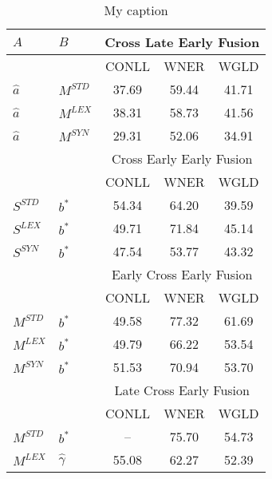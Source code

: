 


\begin{table}[h]
\centering
\begin{tabular}{@{}llccc@{}}
	\toprule
	$A$                      & $B$            & \multicolumn{3}{c}{Cross Late Early Fusion}  \\ \midrule
	                         &                & CONLL & WNER  &             WGLD             \\
	\cmidrule{3-5}
$\hat{a}$ & $M^{STD}$      & 37.69 & 59.44 &            41.71             \\
	$\hat{a}$                & $M^{LEX}$      & 38.31 & 58.73 &            41.56             \\
	$\hat{a}$                & $M^{SYN}$      & 29.31 & 52.06 &            34.91             \\ \midrule
	                         &                & \multicolumn{3}{c}{Cross Early Early Fusion} \\ \midrule
	                         &                & CONLL & WNER  &             WGLD             \\
	\cmidrule{3-5}
$S^{STD}$ & $b^*$          &   54.34    &    64.20   & 39.59 \\
	$S^{LEX}$                & $b^*$          &  49.71     &   71.84    &  45.14\\
	$S^{SYN}$                & $b^*$          &  47.54     &   53.77    & 43.32 \\ \midrule
	                         &                & \multicolumn{3}{c}{Early Cross Early Fusion} \\ \midrule
	                         &                & CONLL & WNER  &             WGLD             \\
	\cmidrule{3-5}
$M^{STD}$ & $b^*$          & 49.58 & 77.32 &            61.69             \\
	$M^{LEX}$                & $b^*$          & 49.79 & 66.22 &            53.54             \\
	$M^{SYN}$                & $b^*$          & 51.53 & 70.94 &            53.70             \\ \midrule
	                         &                & \multicolumn{3}{c}{Late Cross Early Fusion}  \\ \midrule
	                         &                & CONLL & WNER  &             WGLD             \\
	\cmidrule{3-5}
$M^{STD}$ & $b^*$          &  --   & 75.70 &            54.73             \\
	$M^{LEX}$                & $\hat{\gamma}$ & 55.08 & 62.27 &            52.39             \\ \bottomrule
\end{tabular}
\caption{My caption}
\label{my-label}
\end{table}

